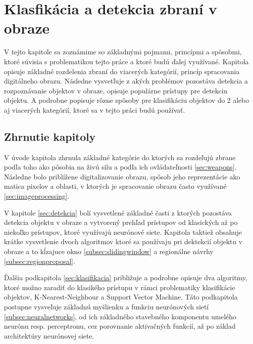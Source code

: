 
\chapter{Klasfikácia a detekcia zbraní v obraze}
\label{chap:technologie}

V tejto kapitole sa zoznámime so základnými pojmami, princípmi a spôsobmi, ktoré súvisia s problematikou tejto práce a ktoré budú ďalej využívané.
Kapitola opisuje základné rozdelenia zbraní do viacerých kategórií, princíp spracovania digitálneho obrazu.
Následne vysvetľuje z akých problémov pozostáva detekcia a rozpoznávanie objektov v obraze, opisuje populárne prístupy pre detekciu objektu.
A podrobne popisuje rôzne spôsoby pre klasifikáciu objektov do 2 alebo aj viacerých kategórií, ktoré sa v tejto práci budú používať.













\section{Zhrnutie kapitoly}

V úvode kapitola zhrnula základné kategórie do ktorých sa rozdeľujú zbrane podľa toho ako pôsobia na živú silu a podľa ich ovládateľnosti \ref{sec:weapons}.
Následne bolo priblížene digitalizovanie obrazu, spôsob jeho reprezentácie ako matica pixelov a oblasti, v ktorých je spracovanie obrazu často využívané \ref{sec:imageprocessing}.

V kapitole \ref{sec:detekcia} bolí vysvetlené základné časti z ktorých pozostáva detekcia objektu v obraze a vytvorený prehľad prístupov od
    klasických až po niekoľko prístupov, ktoré využívajú neurónové siete.
Kapitola taktiež obsahuje krátke vysvetlenie dvoch algoritmov ktoré sa používaju pri dektekcií objektu v obraze a to kĺzajuce okno \ref{subsec:slidingwindow} a
    regionálne návrhy \ref{subsec:regionproposal}.

Ďalšia podkapitola \ref{sec:klasifikacia} približuje a podrobne opisuje dva algoritmy, ktoré možno zaradiť do klasikého prístupu v rámci problematiky klasifikácie objektov,
    K-Nearest-Neighbour a Support Vector Machine.
Táto podkapitola postupne vysveľuje základnú myšlienku a funkciu neurónových sietí \ref{subsec:neuralnetworks}, od ich základného stavebného komponentu umelého neurónu resp. perceptronu,
    cez porovnanie aktivačných funkcií, až po základ architektúry neurónovej siete.

